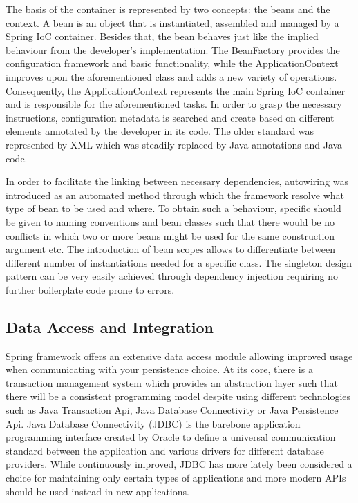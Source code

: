 The basis of the container is represented by two concepts: the beans and the context. A bean is an object that is instantiated, assembled and managed by a Spring IoC container. Besides that, the bean behaves just like the implied behaviour from the developer's implementation. The BeanFactory provides the configuration framework and basic functionality, while the ApplicationContext improves upon the aforementioned class and adds a new variety of operations. Consequently, the ApplicationContext represents the main Spring IoC container and is responsible for the aforementioned tasks. In order to grasp the necessary instructions, configuration metadata is searched and create based on different elements annotated by the developer in its code. The older standard was represented by XML which was steadily replaced by Java annotations and Java code.

In order to facilitate the linking between necessary dependencies, autowiring was introduced as an automated method through which the framework resolve what type of bean to be used and where. To obtain such a behaviour, specific should be given to naming conventions and bean classes such that there would be no conflicts in which two or more beans might be used for the same construction argument etc. The introduction of bean scopes allows to differentiate between different number of instantiations needed for a specific class. The singleton design pattern can be very easily achieved through dependency injection requiring no further boilerplate code prone to errors.

\subsection*{Data Access and Integration}

Spring framework offers an extensive data access module allowing improved usage when communicating with your persistence choice. At its core, there is a transaction management system which provides an abstraction layer such that there will be a consistent programming model despite using different technologies such as Java Transaction Api, Java Database Connectivity or Java Persistence Api. Java Database Connectivity (JDBC) is the barebone application programming interface created by Oracle to define a universal communication standard between the application and various drivers for different database providers. While continuously improved, JDBC has more lately been considered a choice for maintaining only certain types of applications and more modern APIs should be used instead in new applications.

